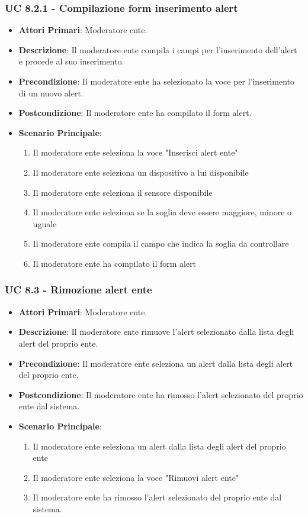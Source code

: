			\subsubsection{UC 8.2.1 - Compilazione form inserimento alert}
			\begin{itemize}
				\item \textbf{Attori Primari}: Moderatore ente.
				\item \textbf{Descrizione}: Il moderatore ente compila i campi per l'inserimento dell'alert e procede al suo inserimento.
				\item \textbf{Precondizione}: Il moderatore ente ha selezionato la voce per l'inserimento di un nuovo alert.
				\item \textbf{Postcondizione}: Il moderatore ente ha compilato il form alert.
				\item \textbf{Scenario Principale}:
				\begin{enumerate}
					\item{Il moderatore ente seleziona la voce "Inserisci alert ente"}
					\item{Il moderatore ente seleziona un dispositivo a lui disponibile}
					\item{Il moderatore ente seleziona il sensore disponibile}
					\item{Il moderatore ente seleziona se la soglia deve essere maggiore, minore o uguale}
					\item{Il moderatore ente compila il campo che indica la soglia da controllare}
					\item{Il moderatore ente ha compilato il form alert}
				\end{enumerate}	
			\end{itemize}

			\subsubsection{UC 8.3 - Rimozione alert ente}
			\begin{itemize}
				\item \textbf{Attori Primari}: Moderatore ente.
				\item \textbf{Descrizione}: Il moderatore ente rimuove l'alert selezionato dalla lista degli alert del proprio ente.
				\item \textbf{Precondizione}: Il moderatore ente seleziona un alert dalla lista degli alert del proprio ente.
				\item \textbf{Postcondizione}: Il moderatore ente ha rimosso l'alert selezionato del proprio ente dal sistema.
				\item \textbf{Scenario Principale}:
				\begin{enumerate}
					\item{Il moderatore ente seleziona un alert dalla lista degli alert del proprio ente}
					\item{Il moderatore ente seleziona la voce "Rimuovi alert ente"}
					\item{Il moderatore ente ha rimosso l'alert selezionato del proprio ente dal sistema.}
				\end{enumerate}	
			\end{itemize}

